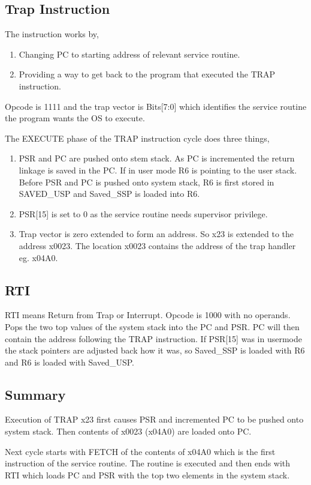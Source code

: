 \subsection{Trap Instruction}
The instruction works by, 
\begin{enumerate}
    \item Changing PC to starting address of relevant service routine.
    \item Providing a way to get back to the program that executed the TRAP instruction.
\end{enumerate}

Opcode is 1111 and the trap vector is Bits[7:0] which identifies the service routine the program wants the OS to execute.

The EXECUTE phase of the TRAP instruction cycle does three things, 
\begin{enumerate}
    \item PSR and PC are pushed onto stem stack. As PC is incremented the return linkage is saved in the PC. If in user mode R6 is pointing to the user stack. Before PSR and PC is pushed onto system stack, R6 is first stored in SAVED\_USP and Saved\_SSP is loaded into R6.
    \item PSR[15] is set to 0 as the service routine needs supervisor privilege.
    \item Trap vector is zero extended to form an address. So x23 is extended to the address x0023. The location x0023 contains the address of the trap handler eg. x04A0.
\end{enumerate}

\subsection{RTI}
RTI means Return from Trap or Interrupt.  Opcode is 1000 with no operands. Pops the two top values of the system stack into the PC and PSR. PC will then contain the address following the TRAP instruction. If PSR[15] was in usermode the stack pointers are adjusted back how it was, so Saved\_SSP is loaded with R6 and R6 is loaded with  Saved\_USP.


\subsection{Summary}
Execution of TRAP x23 first causes PSR and incremented PC to be pushed onto system stack. Then contents of x0023 (x04A0) are loaded onto PC. 

Next cycle starts with FETCH of the contents of x04A0 which is the first instruction of the service routine. The routine is executed and then ends with RTI which loads PC and PSR with the top two elements in the system stack. 


